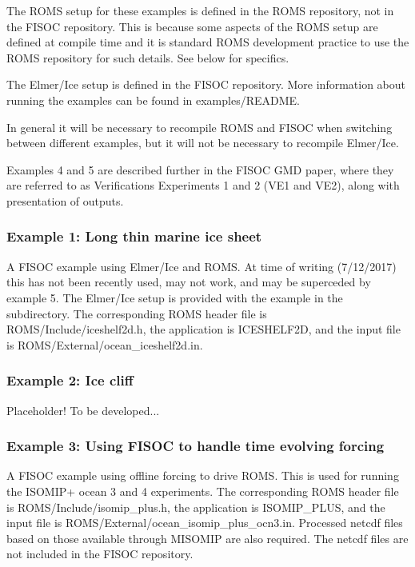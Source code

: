 \documentclass[11pt]{article}
\begin{document}
The ROMS setup for these examples is defined in the ROMS repository, not in the 
FISOC repository.  This is because some aspects of the ROMS setup are defined at 
compile time and it is standard ROMS development practice to use the ROMS 
repository for such details.  See below for specifics. 

The Elmer/Ice setup is defined in the FISOC 
repository.  
More information about running the examples can be found in 
examples/README.

In general it will be necessary to recompile ROMS and FISOC 
when switching between different examples, but it will not be necessary 
to recompile Elmer/Ice.

Examples  4 and 5 are described further in the FISOC GMD paper,
where they are referred to as Verifications Experiments 1 and 2 (VE1 and VE2), 
along with presentation of outputs.



\subsubsection{Example 1: Long thin marine ice sheet}
A FISOC example using Elmer/Ice and ROMS. 
At time of writing (7/12/2017) this has not been 
recently used, may not work, and may be superceded by 
example 5. 
The Elmer/Ice setup is provided with the example in the subdirectory. 
The corresponding ROMS header file is ROMS/Include/iceshelf2d.h, 
the application is ICESHELF2D, and 
the input file is ROMS/External/ocean\_iceshelf2d.in.

\subsubsection{Example 2: Ice cliff}
Placeholder!  To be developed...

\subsubsection{Example 3: Using FISOC to handle time evolving forcing}
A FISOC example using offline forcing to drive ROMS. 
This is used for running the ISOMIP+ ocean 3 and 4 experiments.
The corresponding ROMS header file is ROMS/Include/isomip\_plus.h, 
the application is ISOMIP\_PLUS, 
and the input file is ROMS/External/ocean\_isomip\_plus\_ocn3.in.
Processed netcdf files based on those available through MISOMIP 
are also required.
The netcdf files are not included in the FISOC repository.
\end{document}
